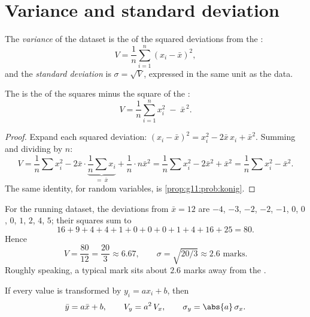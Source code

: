 \section{Variance and standard deviation}

\begin{definition}\label{def:g11:stat:variance}
The \emph{variance} of the dataset is the  of the
squared deviations from the :
\[
V = \frac{1}{n}\sum_{i=1}^{n} (x_i - \bar x)^2,
\]
and the \emph{standard deviation} is
$\sigma = \sqrt{V}$, expressed in the same unit as the data.
\end{definition}

\begin{proposition}\label{prop:g11:stat:shortcut}
The  is the  of the squares minus the square of the :
\[
V = \frac{1}{n}\sum_{i=1}^{n} x_i^2 \;-\; \bar x^{\,2}.
\]
\end{proposition}

\begin{proof}
Expand each squared deviation:
$(x_i - \bar x)^2 = x_i^2 - 2\bar x\, x_i + \bar x^2$. Summing and
dividing by $n$:
\[
V = \frac1n \sum x_i^2 - 2\bar x \cdot \underbrace{\frac1n \sum
x_i}_{=\ \bar x} + \frac1n \cdot n\bar x^2
= \frac1n\sum x_i^2 - 2\bar x^2 + \bar x^2
= \frac1n\sum x_i^2 - \bar x^2 .
\]
The same identity, for random variables, is
\cref{prop:g11:prob:konig}.
\end{proof}

\begin{example}\label{ex:g11:stat:variance}
For the running dataset, the deviations from $\bar x = 12$ are $-4$,
$-3$, $-2$, $-2$, $-1$, $0$, $0$, $0$, $1$, $2$, $4$, $5$; their squares
sum to
\[
16 + 9 + 4 + 4 + 1 + 0 + 0 + 0 + 1 + 4 + 16 + 25 = 80 .
\]
Hence
\[
V = \frac{80}{12} = \frac{20}{3} \approx 6.67,
\qquad
\sigma = \sqrt{20/3} \approx 2.6 \text{ marks}.
\]
Roughly speaking, a typical mark sits about $2.6$ marks away from the
.
\end{example}

\begin{proposition}\label{prop:g11:stat:affine}
If every value is transformed by $y_i = a x_i + b$, then
\[
\bar y = a \bar x + b,
\qquad
V_y = a^2\, V_x,
\qquad
\sigma_y = \abs{a}\,\sigma_x .
\]
\end{proposition}

